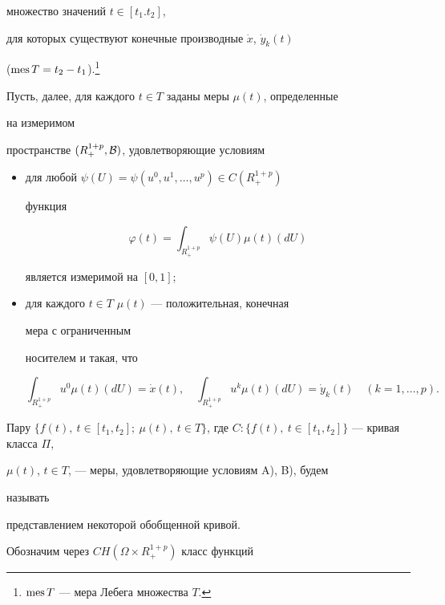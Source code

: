 множество значений $t\in[t_1.t_2]$, 


для которых существуют конечные производные $\Dot x$, $\Dot y_k(t)$ 


($\operatorname{mes} T=t_2-t_1$).\footnote{$\operatorname{mes} T$ --- мера Лебега множества $T$.} 


Пусть, далее, для каждого $t\in T$ заданы меры $\mu(t)$, определенные 


на измеримом 


пространстве $(R^{1+p}_+,\cal B)$, удовлетворяющие условиям 


\begin{itemize} 


\item[A)] для любой $\psi(U)=\psi(u^0,u^1,\dotsc,u^p)\in C(R^{1+p}_+)$ 


функция 


$$ 


\varphi(t)=\int_{R^{1+p}_+}\psi(U)\mu(t)(d U) 


$$ 


является измеримой на $[0,1]$; 


\item[B)] для каждого $t\in T$\; $\mu(t)$ --- положительная, конечная 


мера с ограниченным 


носителем и такая, что 


$$ 


\int_{R^{1+p}_+}u^0\mu(t)(d U)=\Dot x(t),\quad 


\int_{R^{1+p}_+}u^k\mu(t)(d U)=\Dot y_k(t) 


\quad (k=1,\dotsc,p). 


$$ 


\end{itemize} 


\setcounter{footnote}{0}


 


Пару $\{f(t),\ t\in[t_1,t_2];\ \mu(t),\ t\in T\}$, где $C:\{f(t),\ 


t\in[t_1,t_2]\}$ --- кривая класса $\Pi$, 


$\mu(t)$, $t\in T$, --- меры, удовлетворяющие условиям A), B), будем 


называть 


представлением некоторой обобщенной кривой. 


 


Обозначим через $C H(\Omega\times R^{1+p}_+)$ класс функций 


